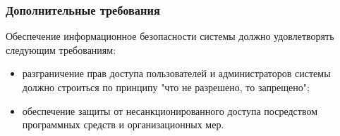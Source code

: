 \subsubsection{Дополнительные требования}


Обеспечение информационное безопасности системы должно удовлетворять следующим требованиям:
\begin{itemize}
\item разграничение прав доступа пользователей и администраторов системы должно строиться по принципу "что не разрешено, то запрещено";
\item обеспечение защиты от несанкционированного доступа посредством программных средств и организационных мер.
\end{itemize}

